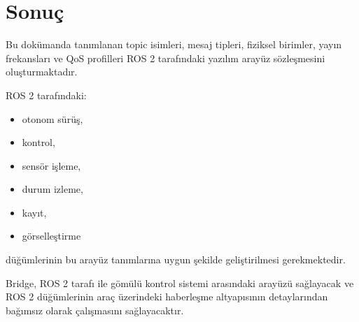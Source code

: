 \documentclass[12pt,a4paper]{article}
\begin{document}
\section{Sonuç}

Bu dokümanda tanımlanan topic isimleri, mesaj tipleri, fiziksel birimler,
yayın frekansları ve QoS profilleri ROS 2 tarafındaki yazılım arayüz
sözleşmesini oluşturmaktadır.

ROS 2 tarafındaki:

\begin{itemize}

    \item otonom sürüş,

    \item kontrol,

    \item sensör işleme,

    \item durum izleme,

    \item kayıt,

    \item görselleştirme

\end{itemize}

düğümlerinin bu arayüz tanımlarına uygun şekilde geliştirilmesi
gerekmektedir.

Bridge, ROS 2 tarafı ile gömülü kontrol sistemi arasındaki arayüzü
sağlayacak ve ROS 2 düğümlerinin araç üzerindeki haberleşme altyapısının
detaylarından bağımsız olarak çalışmasını sağlayacaktır.

\end{document}
